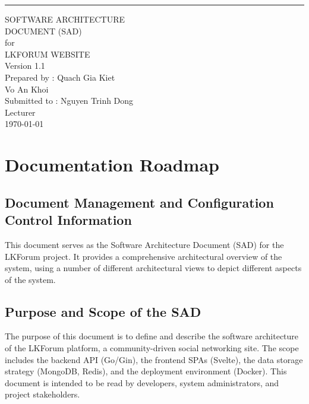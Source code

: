 \documentclass{scrreprt}
\date{}
\def\myversion{1.1}
\begin{document}
\begin{flushright}
    \rule{16cm}{5pt}\vskip1cm
    \begin{bfseries}
        \Huge{SOFTWARE ARCHITECTURE \\ DOCUMENT (SAD)}\\
        \vspace{1.5cm}
        for\\
        \vspace{1.5cm}
        LKFORUM WEBSITE\\
        \vspace{1.5cm}
        \LARGE{Version \myversion}\\
        \vspace{1.5cm}
        Prepared by : Quach Gia Kiet\\
        Vo An Khoi\\
        \vspace{1.5cm}
        Submitted to : Nguyen Trinh Dong \\Lecturer\\
        \vspace{1.5cm}
        \today\\
    \end{bfseries}
\end{flushright}

\tableofcontents

\chapter{Documentation Roadmap}

\section{Document Management and Configuration Control Information}
This document serves as the Software Architecture Document (SAD) for the LKForum project. It provides a comprehensive architectural overview of the system, using a number of different architectural views to depict different aspects of the system. 

\section{Purpose and Scope of the SAD}
The purpose of this document is to define and describe the software architecture of the LKForum platform, a community-driven social networking site. The scope includes the backend API (Go/Gin), the frontend SPAs (Svelte), the data storage strategy (MongoDB, Redis), and the deployment environment (Docker). This document is intended to be read by developers, system administrators, and project stakeholders.
\end{document}
